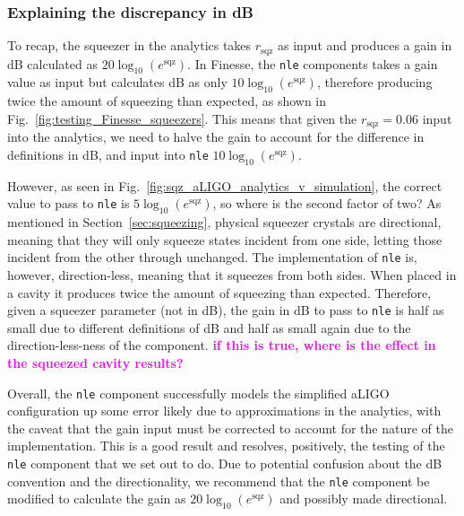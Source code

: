 \documentclass[aps,pra,superscriptaddress,reprint,nofootinbib]{revtex4-1}
\newcommand{\code}[1]{\texttt{#1}}
\newcommand{\jam}[1]{\textcolor{magenta}{\textbf{#1}}}
\begin{document}
\subsubsection{Explaining the discrepancy in dB}

To recap, the squeezer in the analytics takes $r_\mathrm{sqz}$ as input and produces a gain in dB calculated as $20 \log_{10}(e^\mathrm{sqz})$. In Finesse, the \code{nle} components takes a gain value as input but calculates dB as only $10 \log_{10}(e^\mathrm{sqz})$, therefore producing twice the amount of squeezing than expected, as shown in Fig.~\ref{fig:testing_Finesse_squeezers}. This means that given the $r_\mathrm{sqz} = 0.06$ input into the analytics, we need to halve the gain to account for the difference in definitions in dB, and input into \code{nle} $10 \log_{10}(e^\mathrm{sqz})$.


However, as seen in Fig.~\ref{fig:sqz_aLIGO_analytics_v_simulation}, the correct value to pass to \code{nle} is $5 \log_{10}(e^\mathrm{sqz})$, so where is the second factor of two? As mentioned in Section~\ref{sec:squeezing}, physical squeezer crystals are directional, meaning that they will only squeeze states incident from one side, letting those incident from the other through unchanged. The implementation of \code{nle} is, however, direction-less, meaning that it squeezes from both sides. When placed in a cavity it produces twice the amount of squeezing than expected. Therefore, given a squeezer parameter (not in dB), the gain in dB to pass to \code{nle} is half as small due to different definitions of dB and half as small again due to the direction-less-ness of the component. \jam{if this is true, where is the effect in the squeezed cavity results?}


Overall, the \code{nle} component successfully models the simplified aLIGO configuration up some error likely due to approximations in the analytics, with the caveat that the gain input must be corrected to account for the nature of the implementation. This is a good result and resolves, positively, the testing of the \code{nle} component that we set out to do. Due to potential confusion about the dB convention and the directionality, we recommend that the \code{nle} component be modified to calculate the gain as $20 \log_{10}(e^\mathrm{sqz})$ and possibly made directional.
\end{document}
